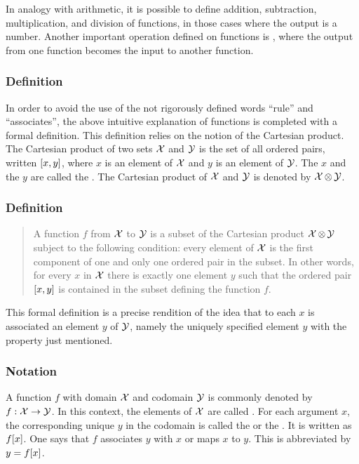 In analogy with arithmetic, it is possible to define addition, subtraction, multiplication, and division of functions, in those cases where the output is a number. Another important operation defined on functions is , where the output from one function becomes the input to another function.


\subsubsection{Definition}
In order to avoid the use of the not rigorously defined words ``rule'' and ``associates'', the above intuitive explanation of functions is completed with a formal definition. This definition relies on the notion of the Cartesian product. The Cartesian product of two sets $\mathcal{X}$ and $\mathcal{Y}$ is the set of all ordered pairs, written $\left[{x,y}\right]$, where $x$ is an element of $\mathcal{X}$ and $y$ is an element of $\mathcal{Y}$. The $x$ and the $y$ are called the . The Cartesian product of $\mathcal{X}$ and $\mathcal{Y}$ is denoted by $\mathcal{X}\operatorname{\otimes}\mathcal{Y}$.


\subsubsection{Definition}
\begin{quote}
A function $f$ from $\mathcal{X}$ to $\mathcal{Y}$ is a subset of the Cartesian product $\mathcal{X}\operatorname{\otimes}\mathcal{Y}$ subject to the following condition: every element of $\mathcal{X}$ is the first component of one and only one ordered pair in the subset. In other words, for every $x$ in $\mathcal{X}$ there is exactly one element $y$ such that the ordered pair $\left[{x,y}\right]$ is contained in the subset defining the function $f$. 
\end{quote}

This formal definition is a precise rendition of the idea that to each $x$ is associated an element $y$ of $\mathcal{Y}$, namely the uniquely specified element $y$ with the property just mentioned.


\subsubsection{Notation}
A function $f$ with domain $\mathcal{X}$ and codomain $\mathcal{Y}$ is commonly denoted by ${f}:{\mathcal{X}}\to{\mathcal{Y}}$. In this context, the elements of $\mathcal{X}$ are called . For each argument $x$, the corresponding unique $y$ in the codomain is called the  or the . It is written as $f\!\left[{x}\right]$. One says that $f$ associates $y$ with $x$ or maps $x$ to $y$. This is abbreviated by $y = f\!\left[{x}\right]$.

